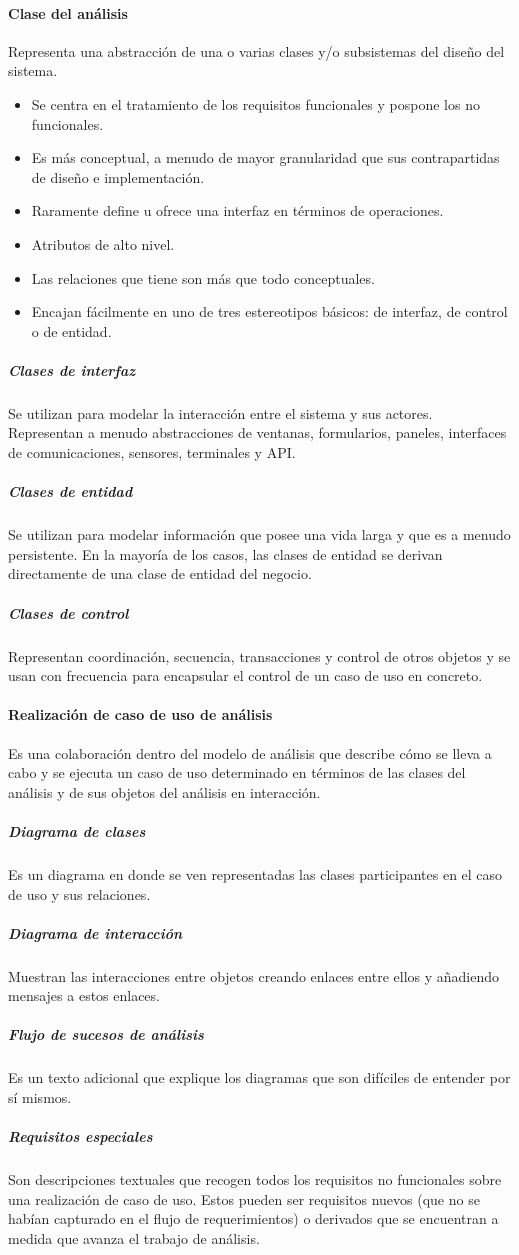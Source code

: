 \paragraph{Clase del análisis}
Representa una abstracción de una o varias clases y/o subsistemas del diseño del sistema.\\
\begin{itemize}
\item Se centra en el tratamiento de los requisitos funcionales y pospone los no funcionales.
\item Es más conceptual, a menudo de mayor granularidad que sus contrapartidas de diseño e implementación.
\item Raramente define u ofrece una interfaz en términos de operaciones.
\item Atributos de alto nivel.
\item Las relaciones que tiene son más que todo conceptuales.
\item Encajan fácilmente en uno de tres estereotipos básicos: de interfaz, de control o de entidad.
\end{itemize}
\subparagraph{Clases de interfaz}
Se utilizan para modelar la interacción entre el sistema y sus actores. Representan a menudo abstracciones de ventanas, formularios, paneles, interfaces de comunicaciones, sensores, terminales y API.
\subparagraph{Clases de entidad}
Se utilizan para modelar información que posee una vida larga y que es a menudo persistente. En la mayoría de los casos, las clases de entidad se derivan directamente de una clase de entidad del negocio.
\subparagraph{Clases de control}
Representan coordinación, secuencia, transacciones y control de otros objetos y se usan con frecuencia para encapsular el control de un caso de uso en concreto.
\paragraph{Realización de caso de uso de análisis}
Es una colaboración dentro del modelo de análisis que describe cómo se lleva a cabo y se ejecuta un caso de uso determinado en términos de las clases del análisis y de sus objetos del análisis en interacción.
\subparagraph{Diagrama de clases}
Es un diagrama en donde se ven representadas las clases participantes en el caso de uso y sus relaciones.
\subparagraph{Diagrama de interacción}
Muestran las interacciones entre objetos creando enlaces entre ellos y añadiendo mensajes a estos enlaces.
\subparagraph{Flujo de sucesos de análisis}
Es un texto adicional que explique los diagramas que son difíciles de entender por sí mismos.
\subparagraph{Requisitos especiales} Son descripciones textuales que recogen todos los requisitos no funcionales sobre una realización de caso de uso. Estos pueden ser requisitos nuevos (que no se habían capturado en el flujo de requerimientos) o derivados que se encuentran a medida que avanza el trabajo de análisis.
